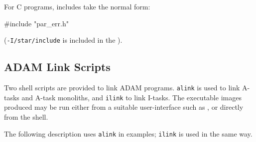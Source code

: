 \documentclass[twoside,11pt,nolof]{starlink}
\begin{document}
For C programs, includes take the normal form:
\begin{terminalv}
#include "par_err.h"
\end{terminalv}
(\texttt{-I/star/include} is included in the
).

\subsection{
\label{link_scripts}ADAM Link Scripts}
Two shell scripts are provided to link ADAM programs.
\texttt{alink} is used to link A-tasks and A-task monoliths, and
\texttt{ilink} to link I-tasks.
The executable images produced may be run either from a suitable user-interface
such as
,
or directly from the shell.

The following description uses \texttt{alink} in examples; \texttt{ilink} is
used in the same way.
\end{document}
